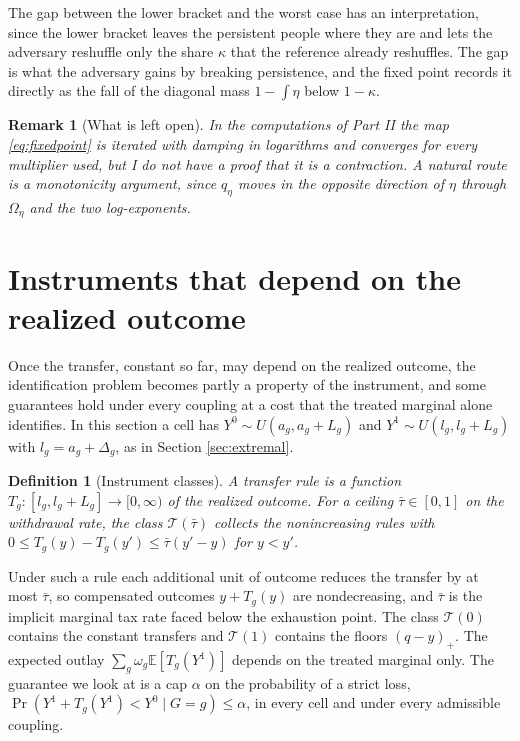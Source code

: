\documentclass[11pt,a4paper]{article}
\theoremstyle{notesplain}
\theoremstyle{notesupright}
\newtheorem{definition}[theorem]{Definition}
\newtheorem{remark}[theorem]{Remark}
\numberwithin{equation}{section}
\newcommand{\E}{\mathbb{E}}
\begin{document}
The gap between the lower bracket and the worst case has an interpretation, since the lower bracket leaves the persistent people where they are and lets the adversary reshuffle only the share $\kappa$ that the reference already reshuffles. The gap is what the adversary gains by breaking persistence, and the fixed point records it directly as the fall of the diagonal mass $1-\int\eta$ below $1-\kappa$.

\begin{remark}[What is left open]
In the computations of Part II the map \eqref{eq:fixedpoint} is iterated with damping in logarithms and converges for every multiplier used, but I do not have a proof that it is a contraction. A natural route is a monotonicity argument, since $q_\eta$ moves in the opposite direction of $\eta$ through $\Omega_\eta$ and the two log-exponents.
\end{remark}

\section{Instruments that depend on the realized outcome}
\label{sec:design}
Once the transfer, constant so far, may depend on the realized outcome, the identification problem becomes partly a property of the instrument, and some guarantees hold under every coupling at a cost that the treated marginal alone identifies. In this section a cell has $Y^0\sim U(a_g,a_g+L_g)$ and $Y^1\sim U(l_g,l_g+L_g)$ with $l_g=a_g+\Delta_g$, as in Section \ref{sec:extremal}.

\begin{definition}[Instrument classes]
A transfer rule is a function $T_g:[l_g,l_g+L_g]\to[0,\infty)$ of the realized outcome. For a ceiling $\bar\tau\in[0,1]$ on the withdrawal rate, the class $\mathcal T(\bar\tau)$ collects the nonincreasing rules with $0\le T_g(y)-T_g(y')\le\bar\tau(y'-y)$ for $y<y'$.
\end{definition}

Under such a rule each additional unit of outcome reduces the transfer by at most $\bar\tau$, so compensated outcomes $y+T_g(y)$ are nondecreasing, and $\bar\tau$ is the implicit marginal tax rate faced below the exhaustion point. The class $\mathcal T(0)$ contains the constant transfers and $\mathcal T(1)$ contains the floors $(q-y)_+$. The expected outlay $\sum_g\omega_g\E[T_g(Y^1)]$ depends on the treated marginal only. The guarantee we look at is a cap $\alpha$ on the probability of a strict loss, $\Pr(Y^1+T_g(Y^1)<Y^0\mid G=g)\le\alpha$, in every cell and under every admissible coupling.
\end{document}
